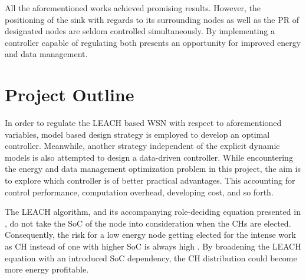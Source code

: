 \noindent All the aforementioned works achieved promising results. However, the positioning of the sink with regards to its surrounding nodes as well as the PR of designated nodes are seldom controlled simultaneously. By implementing a controller capable of regulating both presents an opportunity for improved energy and data management.


\section{Project Outline}
\label{sec:prjoutline} 
\noindent In order to regulate the LEACH based WSN with respect to aforementioned variables, model based design strategy is employed to develop an optimal controller. Meanwhile, another strategy independent of the explicit dynamic models is also attempted to design a data-driven controller. While encountering the energy and data management optimization problem in this project, the aim is to explore which controller is of better practical advantages. This accounting for control performance, computation overhead, developing cost, and so forth. \newline

\noindent The LEACH algorithm, and its accompanying role-deciding equation presented in \cite{heinzelman2000energy}, do not take the SoC of the node into consideration when the CHs are elected. Consequently, the risk for a low energy node getting elected for the intense work as CH instead of one with higher SoC is always high \cite{heinzelman2000energy}. By broadening the LEACH equation with an introduced SoC dependency, the CH distribution could become more energy profitable.


